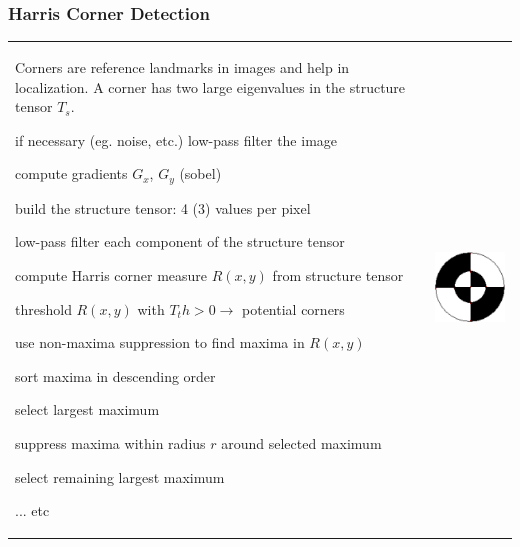     \subsubsection{Harris Corner Detection}
      \begin{tabular}{ll}
        \parbox{13cm}{
          Corners are reference landmarks in images and help in localization.
          A corner has two large eigenvalues in the structure tensor $T_s$.
          
          \begin{aufzaehlung}
            \item  if necessary (eg. noise, etc.) low-pass filter the image 
            \item  compute gradients $G_x$, $G_y$ (sobel)
            \item  build the structure tensor: 4 (3) values per pixel
            \item  low-pass filter each component of the structure tensor
            \item  compute Harris corner measure $R(x,y)$ from structure tensor
            \item  threshold $R(x,y)$ with $T_th > 0 \rightarrow$ potential corners
            \item  use non-maxima suppression to find maxima in $R(x,y)$
              \begin{liste}
                \item sort maxima in descending order
                \item select largest maximum
                \item suppress maxima within radius $r$ around selected maximum
                \item select remaining largest maximum
                \item ... etc
              \end{liste}
          \end{aufzaehlung}
          }
          & \parbox{5cm}{
            \includegraphics[width=4cm]{./images/marker.png}}
      \end{tabular}
      

